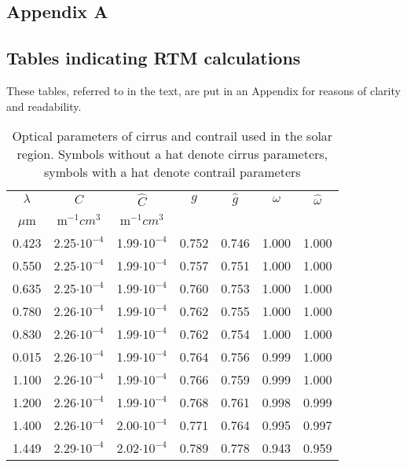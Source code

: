 \documentclass[agp]{svjour}
\begin{document}
\begin{appendix}

\section*{Appendix A}
\label{sec:a}

\subsection*{Tables indicating RTM calculations}

These tables, referred to in the text, are put in an Appendix for
reasons of clarity and readability.

\begin{table}
\caption[]{Optical parameters of cirrus and contrail used in the solar
region. Symbols without a hat denote cirrus parameters, symbols with a
hat denote contrail parameters}
\begin{tabular*}{84.22mm}{@{\hspace{0pt}\extracolsep{-.8pt}}ccccccc@{\hspace{0pt}}}
\hline
\noalign{\smallskip}
$\lambda$& $C$ & $\hat{C}$ & $g$ & $\hat{g}$ & $\omega $ & $\hat{\omega}$ \\
$\mu$m & m$^{-1}cm^3$ & m$^{-1}cm^3$ & & & & \\
\noalign{\smallskip}
\hline
\noalign{\smallskip}
0.423 & 2.25$\cdot 10^{-4}$ & 1.99$\cdot 10^{-4}$ & 0.752 & 0.746 & 1.000 & 1.000 \\
0.550 & 2.25$\cdot 10^{-4}$ & 1.99$\cdot 10^{-4}$ & 0.757 & 0.751 & 1.000 & 1.000 \\
0.635 & 2.25$\cdot 10^{-4}$ & 1.99$\cdot 10^{-4}$ & 0.760 & 0.753 & 1.000 & 1.000 \\
0.780 & 2.26$\cdot 10^{-4}$ & 1.99$\cdot 10^{-4}$ & 0.762 & 0.755 & 1.000 & 1.000 \\
0.830 & 2.26$\cdot 10^{-4}$ & 1.99$\cdot 10^{-4}$ & 0.762 & 0.754 & 1.000 & 1.000 \\
0.015 & 2.26$\cdot 10^{-4}$ & 1.99$\cdot 10^{-4}$ & 0.764 & 0.756 & 0.999 & 1.000 \\
1.100 & 2.26$\cdot 10^{-4}$ & 1.99$\cdot 10^{-4}$ & 0.766 & 0.759 & 0.999 & 1.000 \\
1.200 & 2.26$\cdot 10^{-4}$ & 1.99$\cdot 10^{-4}$ & 0.768 & 0.761 & 0.998 & 0.999 \\
1.400 & 2.26$\cdot 10^{-4}$ & 2.00$\cdot 10^{-4}$ & 0.771 & 0.764 & 0.995 & 0.997 \\
1.449 & 2.29$\cdot 10^{-4}$ & 2.02$\cdot 10^{-4}$ & 0.789 & 0.778 & 0.943 & 0.959 \\

\end{tabular*}
\end{table}
\end{appendix}
\end{document}

